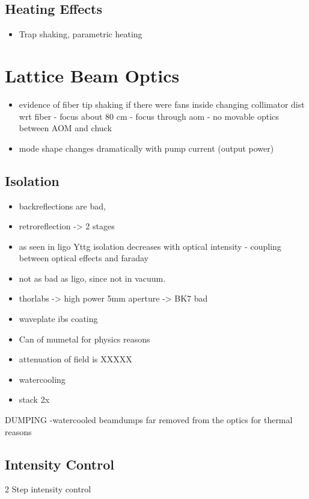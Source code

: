 \documentclass[twocolumn,aps,pra,showpacs,preprintnumbers,bibnotes]{revtex4-1}
\begin{document}
\subsection{Heating Effects}
\begin{itemize}
	\item Trap shaking, parametric heating
\end{itemize}

\section{Lattice Beam Optics}


\begin{itemize}
\item evidence of fiber tip shaking if there were fans inside
changing collimator dist wrt fiber - focus about 80 cm - focus through aom - no movable optics between AOM and chuck
\item mode shape changes dramatically with pump current (output power)
\end{itemize}

\subsection{Isolation}
\begin{itemize}
\item backreflections are bad,
\item retroreflection -> 2 stages
\item as seen in ligo Yttg isolation decreases with optical intensity - coupling between optical effects and faraday
\item not as bad as ligo, since not in vacuum.
\item thorlabs -> high power 5mm aperture -> BK7 bad
\item waveplate ibs coating
\item Can of mumetal for physics reasons
\item attenuation of field is XXXXX
\item watercooling
\item stack 2x
\end{itemize}

DUMPING
-watercooled beamdumps far removed from the optics for thermal reasons
\subsection{Intensity Control}
2 Step intensity control
\end{document}
